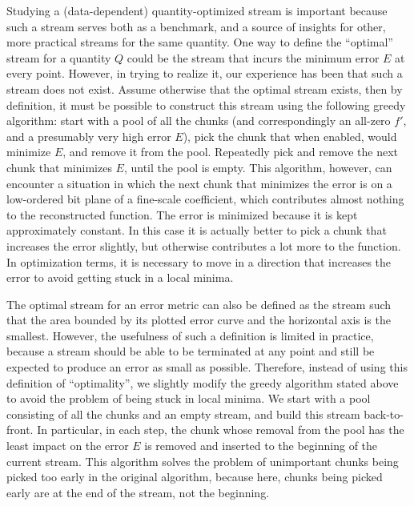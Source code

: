 Studying a (data-dependent) quantity-optimized stream is important because such a stream serves both
as a benchmark, and a source of insights for other, more practical streams for the same quantity.
One way to define the ``optimal'' stream for a quantity $Q$ could be the stream that incurs the
minimum error $E$ at every point. However, in trying to realize it, our experience has been that
such a stream does not exist. Assume otherwise that the optimal stream exists, then by definition,
it must be possible to construct this stream using the following greedy algorithm: start with a pool
of all the chunks (and correspondingly an all-zero $f'$, and a presumably very high error $E$), pick
the chunk that when enabled, would minimize $E$, and remove it from the pool. Repeatedly pick and
remove the next chunk that minimizes $E$, until the pool is empty. This algorithm, however, can
encounter a situation in which the next chunk that minimizes the error is on a low-ordered bit plane
of a fine-scale coefficient, which contributes almost nothing to the reconstructed function. The
error is minimized because it is kept approximately constant. In this case it is actually better to
pick a chunk that increases the error slightly, but otherwise contributes a lot more to the
function. In optimization terms, it is necessary to move in a direction that increases the error to
avoid getting stuck in a local minima.

The optimal stream for an error metric can also be defined as the stream such that the area bounded
by its plotted error curve and the horizontal axis is the smallest. However, the usefulness of such
a definition is limited in practice, because a stream should be able to be terminated at any point
and still be expected to produce an error as small as possible. Therefore, instead of using this
definition of ``optimality'', we slightly modify the greedy algorithm stated above to avoid the
problem of being stuck in local minima. We start with a pool consisting of all the chunks and an
empty stream, and build this stream back-to-front. In particular, in each step, the chunk whose
removal from the pool has the least impact on the error $E$ is removed and inserted to the beginning
of the current stream. This algorithm solves the problem of unimportant chunks being picked too
early in the original algorithm, because here, chunks being picked early are at the end of the
stream, not the beginning.

